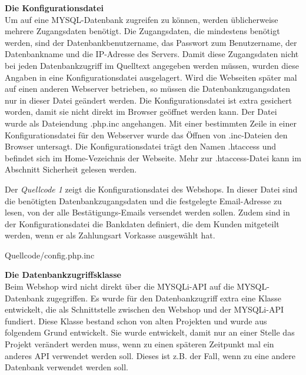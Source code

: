 \textbf{Die Konfigurationsdatei}\\
Um auf eine MYSQL-Datenbank zugreifen zu können, werden üblicherweise mehrere Zugangsdaten benötigt. Die Zugangsdaten, die mindestens benötigt werden, sind der Datenbankbenutzername, das Passwort zum Benutzername, der Datenbankname und die IP-Adresse des Servers. Damit diese Zugangsdaten nicht bei jeden Datenbankzugriff im Quelltext angegeben werden müssen, wurden diese Angaben in eine Konfigurationsdatei ausgelagert. Wird die Webseiten später mal auf einen anderen Webserver betrieben, so müssen die Datenbankzugangsdaten nur in dieser Datei geändert werden. Die Konfigurationsdatei ist extra gesichert worden, damit sie nicht direkt im Browser geöffnet werden kann. Der Datei wurde als Dateiendung \glqq *.php.inc\grqq{} angehangen. Mit einer bestimmten Zeile in einer Konfigurationsdatei für den Webserver wurde das Öffnen von \glqq *.inc\grqq{}-Dateien den Browser untersagt. Die Konfigurationsdatei trägt den Namen \glqq .htaccess\grqq{} und befindet sich im Home-Vezeichnis der Webseite. Mehr zur \glqq .htaccess\grqq{}-Datei kann im Abschnitt \glqq Sicherheit\grqq{} gelesen werden.

Der \textit{Quellcode 1} zeigt die Konfigurationsdatei des Webshops. In dieser Datei sind die benötigten Datenbankzugangsdaten und die festgelegte Email-Adresse zu lesen, von der alle Bestätigungs-Emails versendet werden sollen. Zudem sind in der Konfigurationsdatei die Bankdaten definiert, die dem Kunden mitgeteilt werden, wenn er als Zahlungsart \glqq Vorkasse\grqq{} ausgewählt hat.
\newpage
\begin{center}
	\begin{lstinputlisting}[language=PHP, caption={Die Konfigurationsdatei}]
		{Quellcode/config.php.inc}
	\end{lstinputlisting}
\end{center}

\textbf{Die Datenbankzugriffsklasse}\\
Beim Webshop wird nicht direkt über die \glqq MYSQLi\grqq{}-API auf die MYSQL-Datenbank zugegriffen. Es wurde für den Datenbankzugriff extra eine Klasse entwickelt, die als Schnittstelle zwischen den Webshop und der \glqq MYSQLi\grqq{}-API fundiert. Diese Klasse bestand schon von alten Projekten und wurde aus folgendem Grund entwickelt. Sie wurde entwickelt, damit nur an einer Stelle das Projekt verändert werden muss, wenn zu einen späteren Zeitpunkt mal ein anderes API verwendet werden soll. Dieses ist z.B. der Fall, wenn zu eine andere Datenbank verwendet werden soll.


